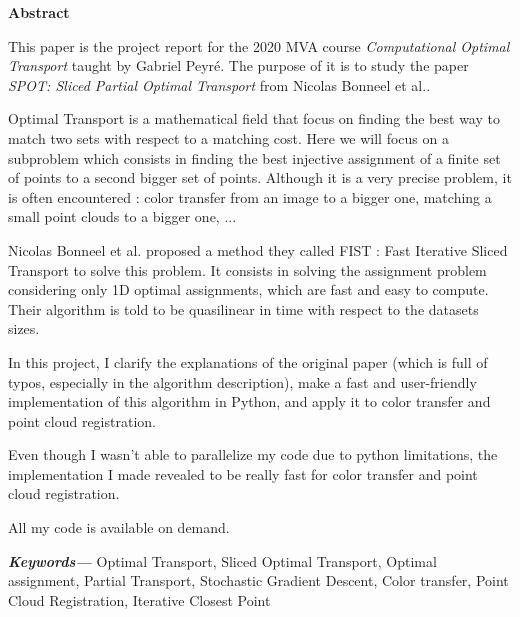 \documentclass[a4paper,12pt]{article}
\providecommand{\keywords}[1]
{
  \textbf{\textit{Keywords---}} #1
}
\begin{document}

\tableofcontents
\thispagestyle{empty}
\setcounter{page}{0}

\newpage


\begin{center}
\textbf{Abstract}
\end{center}

This paper is the project report for the 2020 MVA course \textit{Computational Optimal Transport} taught by Gabriel Peyré. The purpose of it is to study the paper \textit{SPOT: Sliced Partial Optimal Transport} from Nicolas Bonneel et al.\cite{BC19}.

Optimal Transport is a mathematical field that focus on finding the best way to match two sets with respect to a matching cost. Here we will focus on a subproblem which consists in finding the best injective assignment of a finite set of points to a second bigger set of points. Although it is a very precise problem, it is often encountered : color transfer from an image to a bigger one, matching a small point clouds to a bigger one, ...

Nicolas Bonneel et al. proposed a method they called FIST : Fast Iterative Sliced Transport to solve this problem. It consists in solving the assignment problem considering only 1D optimal assignments, which are fast and easy to compute. Their algorithm is told to be quasilinear in time with respect to the datasets sizes.

In this project, I clarify the explanations of the original paper (which is full of typos, especially in the algorithm description), make a fast and user-friendly implementation of this algorithm in Python, and apply it to color transfer and point cloud registration.

Even though I wasn't able to parallelize my code due to python limitations, the implementation I made revealed to be really fast for color transfer and point cloud registration.

All my code is available on demand.

\bigskip


\keywords{Optimal Transport, Sliced Optimal Transport, Optimal assignment, Partial Transport, Stochastic Gradient Descent, Color transfer,  Point Cloud Registration, Iterative Closest Point}
\end{document}
